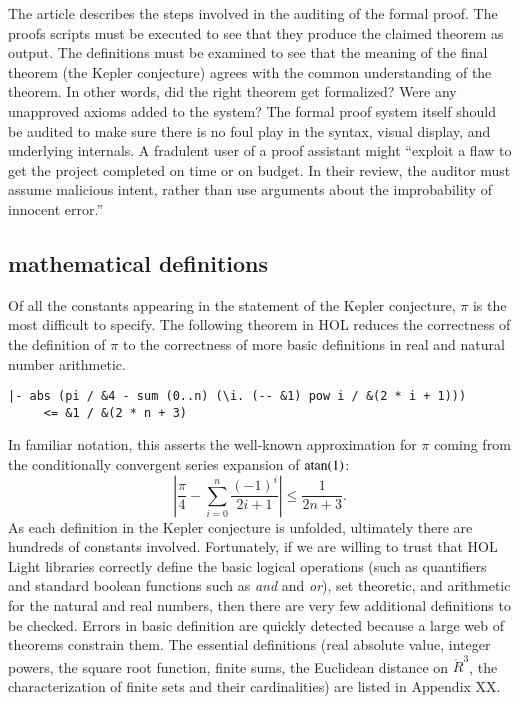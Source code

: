 The article \cite{XX-Adams} describes the steps involved in the
auditing of the formal proof.  The proofs scripts must be executed to
see that they produce the claimed theorem as output.  The definitions
must be examined to see that the meaning of the final theorem (the
Kepler conjecture) agrees with the common understanding of the
theorem.  In other words, did the right theorem get formalized?  Were
any unapproved axioms added to the system?  The formal proof system
itself should be audited to make sure there is no foul play in the
syntax, visual display, and underlying internals.  A fradulent user of
a proof assistant might ``exploit a flaw to get the project completed
on time or on budget.  In their review, the auditor must assume
malicious intent, rather than use arguments about the improbability of
innocent error.''

\subsection{mathematical definitions}

Of all the constants appearing in the statement of the Kepler
conjecture, $\pi$ is the most difficult to specify.  The following
theorem in HOL reduces the correctness of the definition of $\pi$
to the correctness of more basic definitions in real and natural
number arithmetic.

\begin{obeylines}

\begin{verbatim}
|- abs (pi / &4 - sum (0..n) (\i. (-- &1) pow i / &(2 * i + 1))) 
     <= &1 / &(2 * n + 3)
\end{verbatim}

\end{obeylines}

In familiar notation, this asserts the well-known approximation for $\pi$ coming from the conditionally convergent
series expansion of  ${\operatorname{atan}}(1)$:
\[
   \left| \frac{\pi}{4} - \sum_{i=0}^n \frac { (-1)^i } { 2 i + 1} \right | \le \frac {1} {2 n + 3}.
\]
As each definition in the Kepler conjecture is unfolded, ultimately there are hundreds of constants involved.
Fortunately, if we are willing to trust that HOL Light libraries correctly define the basic logical operations (such as quantifiers and
standard boolean functions such as {\it and} and {\it or}),  set theoretic, and arithmetic for the natural and real numbers, then
there are very few additional definitions to be checked.  Errors in basic definition are quickly detected because a large
web of theorems constrain them.
The essential definitions (real absolute value, integer powers, the square root function, finite sums,
the Euclidean distance on $\ring{R}^3$,  the characterization of finite sets and their cardinalities) are listed in Appendix XX.

